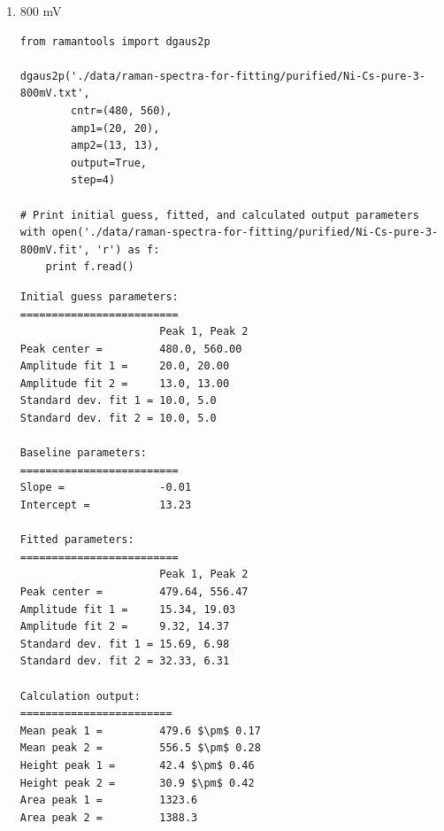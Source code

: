 \documentclass[journal=jpccck,manuscript=suppinfo,email=true]{achemso}
\begin{document}
\begin{enumerate}
\begin{enumerate}
\begin{enumerate}
\begin{verbatim}
Baseline parameters:
=========================
Slope =               -0.01
Intercept =           12.83

Fitted parameters:
=========================
                      Peak 1, Peak 2
Peak center =         478.97, 557.14
Amplitude fit 1 =     16.18, 18.71
Amplitude fit 2 =     9.01, 11.93
Standard dev. fit 1 = 16.10, 5.74
Standard dev. fit 2 = 30.03, 6.17

Calculation output:
========================
Mean peak 1 =         479.0 $\pm$ 0.16
Mean peak 2 =         557.1 $\pm$ 0.30
Height peak 1 =       43.0 $\pm$ 0.45
Height peak 2 =       28.2 $\pm$ 0.39
Area peak 1 =         1304.4
Area peak 2 =         1219.4
\end{verbatim}

\item 800 mV
\label{sec-4-1-0-2-3-3}
\begin{verbatim}
from ramantools import dgaus2p

dgaus2p('./data/raman-spectra-for-fitting/purified/Ni-Cs-pure-3-800mV.txt',
        cntr=(480, 560),
        amp1=(20, 20),
        amp2=(13, 13),
        output=True,
        step=4)

# Print initial guess, fitted, and calculated output parameters
with open('./data/raman-spectra-for-fitting/purified/Ni-Cs-pure-3-800mV.fit', 'r') as f:
    print f.read()
\end{verbatim}

\begin{verbatim}
Initial guess parameters:
=========================
                      Peak 1, Peak 2
Peak center =         480.0, 560.00
Amplitude fit 1 =     20.0, 20.00
Amplitude fit 2 =     13.0, 13.00
Standard dev. fit 1 = 10.0, 5.0
Standard dev. fit 2 = 10.0, 5.0

Baseline parameters:
=========================
Slope =               -0.01
Intercept =           13.23

Fitted parameters:
=========================
                      Peak 1, Peak 2
Peak center =         479.64, 556.47
Amplitude fit 1 =     15.34, 19.03
Amplitude fit 2 =     9.32, 14.37
Standard dev. fit 1 = 15.69, 6.98
Standard dev. fit 2 = 32.33, 6.31

Calculation output:
========================
Mean peak 1 =         479.6 $\pm$ 0.17
Mean peak 2 =         556.5 $\pm$ 0.28
Height peak 1 =       42.4 $\pm$ 0.46
Height peak 2 =       30.9 $\pm$ 0.42
Area peak 1 =         1323.6
Area peak 2 =         1388.3
\end{verbatim}
\end{enumerate}
\end{enumerate}
\end{enumerate}
\end{document}
